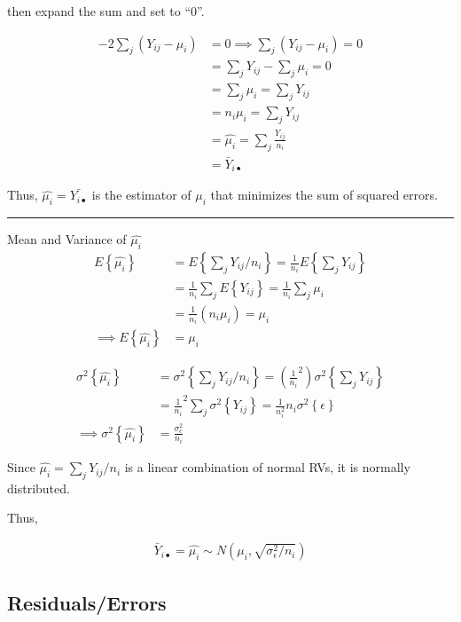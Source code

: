 \documentclass[10pt]{article}
\newcommand{\mean}[1]{\mu_{#1}}
\renewcommand{\exp}[1]{E\left\{#1\right\}} %
\newcommand{\var}[1]{\sigma^2\left\{#1\right\}}
\newcommand{\sigvar}[1]{\sigma^2_{#1}} %
\newcommand{\drawline}{\noindent\rule{\linewidth}{0.1pt}}
\begin{document}
\begin{multicols}{3}
    then expand the sum and set to ``0''.

    \begin{align*}
        -2 \sum_j (Y_{ij} - \mean{i})  & = 0 \implies \sum_j (Y_{ij} - \mean{i}) = 0 \\
            & = \sum_j{Y_{ij}} - \sum_j{\mean{i}} = 0 \\
            & = \sum_j \mean{i} = \sum_j Y_{ij} \\
            & = n_i \mean{i} = \sum_j Y_{ij} \\
            & = \hat{\mean{i}} = \sum_j \frac{Y_{ij}}{n_i} \\
            & = \bar Y_{i\bullet}
    \end{align*}

    Thus, $\hat{\mean{i}} = \bar{Y_{i\bullet}}$ is the estimator of $\mean{i}$ that minimizes the sum of squared errors.

    \drawline

    Mean and Variance of $\hat{\mean{i}}$
    \begin{align*}
        \exp{\hat{\mean{i}}} & = \exp{\sum_j Y_{ij}/n_i} = \frac{1}{n_i} \exp{\sum_j Y_{ij}} \\
            & = \frac{1}{n_i} \sum_j \exp{Y_{ij}} = \frac{1}{n_i} \sum_j \mean{i} \\
            & = \frac{1}{n_i} (n_i \mean{i}) = \mean{i} \\
        \implies \exp{\hat{\mean{i}}} & = \mean{i} 
    \end{align*}

    \begin{align*}
        \var{\hat{\mean{i}}} & = \var{\sum_j Y_{ij}/n_i} = (\frac{1}{n_i}^2) \var{\sum_j Y_{ij}} \\
            & = \frac{1}{n_i}^2 \sum_j \var{Y_{ij}} = \frac{1}{n_i^2} n_i \var{\epsilon} \\
        \implies \var{\hat{\mean{i}}} & = \frac{\sigvar{\epsilon}}{n_i}
    \end{align*}

    Since $\hat{\mean{i}} = \sum_j Y_{ij}/n_i$ is a linear combination of normal RVs, it is normally distributed.

    Thus, 

    \begin{align*}
        \bar Y_{i\bullet} = \hat{\mean{i}} \sim N(\mean{i}, \sqrt{\sigvar{\epsilon}/n_i})
    \end{align*}

    \subsection{Residuals/Errors}


\end{multicols}
\end{document}
